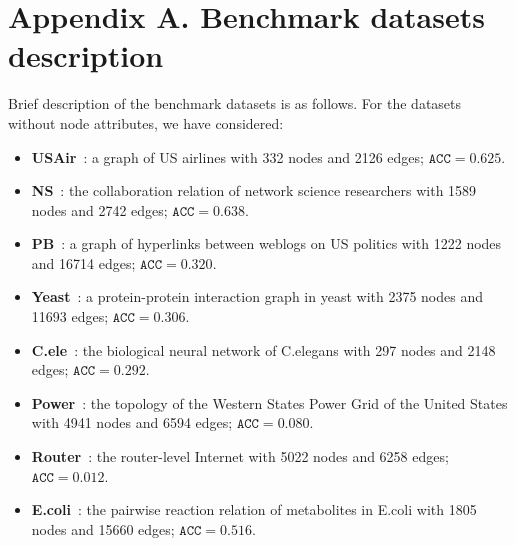 \documentclass[11pt]{article}
\begin{document}



\newpage 

\section*{Appendix A. Benchmark datasets description}
Brief description of the benchmark datasets is as follows. For the datasets without node attributes, we have considered:
\vspace{-1mm}
\begin{itemize}
\item \textbf{USAir}~\citep{usair}: a graph of US airlines with 332 nodes and 2126 edges; $\mathtt{ACC} = 0.625$.
\item \textbf{NS}~\citep{newman2006finding}: the collaboration relation of network science researchers with 1589 nodes and 2742 edges; $\mathtt{ACC} = 0.638$.
\item \textbf{PB}~\citep{ackland2005mapping}: a graph of hyperlinks between weblogs on US politics  with 1222 nodes and 16714 edges; $\mathtt{ACC} = 0.320$.
\item \textbf{Yeast}~\citep{von2002comparative}: a protein-protein interaction graph in yeast with 2375 nodes and 11693 edges; $\mathtt{ACC} = 0.306$. 
\item \textbf{C.ele}~\citep{watts1998collective}: the biological neural network of C.elegans with 297 nodes and 2148 edges; $\mathtt{ACC} = 0.292$.
\item \textbf{Power}~\citep{watts1998collective}: the topology of the Western States Power Grid of the United States with 4941 nodes and 6594 edges; $\mathtt{ACC} = 0.080$.
\item \textbf{Router}~\citep{spring2002measuring}: the router-level Internet with 5022 nodes and 6258 edges; $\mathtt{ACC} = 0.012$.
\item \textbf{E.coli}~\citep{zhang2018beyond}: the pairwise reaction relation of metabolites in E.coli with 1805 nodes and 15660 edges; $\mathtt{ACC} = 0.516$.
\vspace{-1mm}
\end{itemize}
\end{document}
